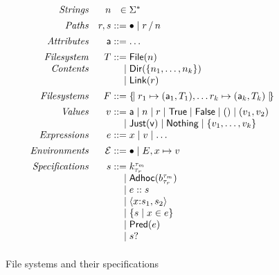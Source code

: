 \documentclass[nocopyrightspace,natbib]{sigplanconf}
\begin{document}
\begin{figure}
\[
\begin{array}{rr@{\;}r@{\;}l}
\textit{Strings}        & n & \in & \Sigma^{\ast} \\[1ex]
\textit{Paths}          & r,s & \bnfdef & \PNil \mid \PCons{r}{n} \\[1ex]
\textit{Attributes}     & \att  & \bnfdef & \dots\\[1ex]
\textit{Filesystem}     & T  & \bnfdef & \File{n} \\
\textit{Contents}       &    & \bnfalt & \Dir{ \Set{n_1,\dots,n_k} }\\
                        &    & \bnfalt & \Link{r}\\[1ex]
\textit{Filesystems}    & F & \bnfdef & \Map{ r_1 \mapsto (\att_1,T_1), \dots r_k \mapsto (\att_k,T_k) }\\[1ex]
\textit{Values}         & v & \bnfdef & \att \bnfalt n \bnfalt r \bnfalt \True \bnfalt \False \bnfalt () \bnfalt (v_1,v_2) \\
                        &   & \bnfalt & \Just{v} \bnfalt \Nothing \bnfalt \{ v_1,\dots,v_k \}\\
\textit{Expressions}    & e & \bnfdef & x \bnfalt v \bnfalt \dots \\[1ex]
\textit{Environments}   & \Env & \bnfdef & \ENil \bnfalt E,x\mapsto v \\[1ex]
\textit{Specifications} & s & \bnfdef & \Sk \\
                        &   & \bnfalt & \SAdhoc{b}\\
                        &   & \bnfalt & \SPath{e}{s}\\
                        &   & \bnfalt & \SPair{x}{s_1}{s_2}\\
                        &   & \bnfalt & \SSetComp{s}{x}{e}\\
                        &   & \bnfalt & \SPred{e}\\
                        &   & \bnfalt & \SOption{s}\\[1ex]
\end{array}
\]
\caption{File systems and their specifications}
\label{fig:calculus-syntax}
\end{figure}
\end{document}
